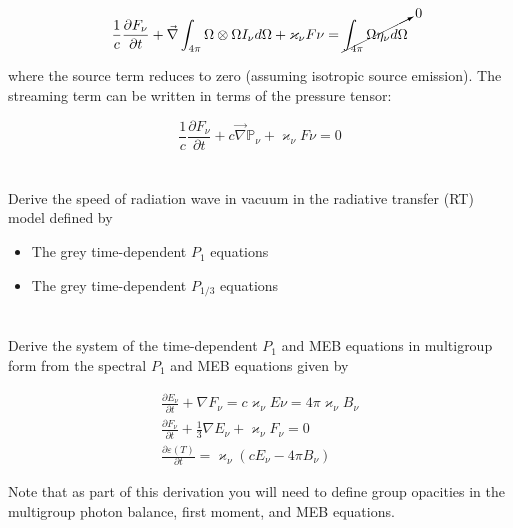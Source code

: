 \documentclass{template}
\begin{document}
\begin{equation}
    \frac{1}{c}\frac{\partial F_\nu}{\partial t} + \vec{\nabla}\int_{4\pi} {\Omega \otimes \Omega I_\nu d\Omega} + \varkappa_\nu F\nu = \cancelto{0}{\int_{4\pi} {\Omega \eta_\nu d\Omega}}
\end{equation}

where the source term reduces to zero (assuming isotropic source emission). The streaming term can be written in terms of the pressure tensor:

\begin{equation}
    \boxed{\frac{1}{c}\frac{\partial F_\nu}{\partial t} + c\vec{\nabla}\mathbb{P}_\nu + \varkappa_\nu F\nu = 0}
\end{equation}



\section{} Derive the speed of radiation wave in vacuum in the radiative transfer (RT) model defined by

\begin{itemize}
    \item The grey time-dependent $P_1$ equations
    \item The grey time-dependent $P_{1/3}$ equations
\end{itemize}


\section{} Derive the system of the time-dependent $P_1$ and MEB equations in multigroup form from the spectral $P_1$ and MEB equations given by

\begin{gather*}
    \frac{\partial E_\nu}{\partial t} + \nabla F_\nu = c\varkappa_\nu E\nu = 4\pi \varkappa_\nu B_\nu\\
    \frac{\partial F_\nu}{\partial t} + \frac{1}{3}\nabla E_\nu + \varkappa_\nu F_\nu = 0\\
    \frac{\partial \varepsilon(T)}{\partial t} = \varkappa _ \nu (cE_\nu - 4\pi B_\nu)
\end{gather*}


Note that as part of this derivation you will need to define group opacities in the multigroup photon balance, first moment, and MEB equations.

\end{document}

